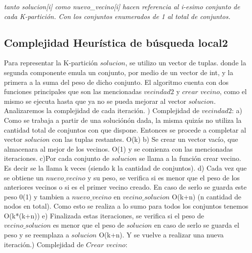 \documentclass[a4paper]{article}
\begin{document}
 \textit {tanto solucion[i] como nuevo\_vecino[i] hacen referencia al i-esimo conjunto de cada K-partici\'on. Con los conjuntos enumerados de 1 al total de conjuntos.}
 
\subsection{Complejidad Heurística de búsqueda local2}
 
Para representar la K-partici\'on $solucion$, se utilizo un vector de tuplas. donde la segunda componente emula un conjunto, por medio de un vector de int, y la primera a la suma del peso de dicho conjunto. 
El algoritmo cuenta con dos funciones principales que son las mencionadas $vecindad2$ y $crear$ $vecino$, como el mismo se ejecuta hasta que ya no se pueda mejorar al vector $solucion$. Analizaremos la complejidad de cada iteraci\'on.  \newline {}) Complejidad de $vecindad2$:\newline
a) Como se trabaja a partir de una soluci\'on\'on dada, la misma quiz\'as no utiliza la cantidad total de conjuntos con que dispone. Entonces se procede a completar al vector $solucion$ con las tuplas restantes. O(k)\newline
b) Se crear un vector vac\'io, que almacenara al mejor de los vecinos. O(1) y se comienza con las mencionadas iteraciones. \newline
c)Por cada conjunto de $solucion$ se llama a la funci\'on crear vecino. Es decir se la llama k veces (siendo k la cantidad de conjuntos). \newline
d) Cada vez que se obtiene un $nuevo\_vecino$ y su peso, se verifica si es menor que el peso de los anteriores vecinos o si es el primer vecino creado. En caso de serlo se guarda este peso 0(1) y tambien a $nuevo\_vecino$ en $vecino\_solucion$ O(k+n) (n cantidad de nodos en total). Como esto se realiza a lo sumo para todos los conjuntos tenemos O(k*(k+n))\newline
e) Finalizada estas iteraciones, se verifica si el peso de $vecino\_solucion$ es menor que el peso de $solucion$ en caso de serlo se guarda el peso y se reemplaza a $solucion$ O(k+n). Y se vuelve a realizar una nueva iteraci\'on.\newline {}) Complejidad de $Crear$ $vecino$: \newline
\end{document}
